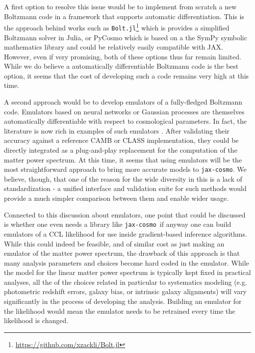 \documentclass[twocolumn,twocolappendix,nofootinbib,iop]{openjournal}
\newcommand{\jaxcosmo}{\texttt{jax-cosmo}}
\begin{document}
A first option to resolve this issue would be to implement from scratch a new Boltzmann code in a framework that supports automatic differentiation. This is the approach behind works such as \texttt{Bolt.jl}\footnote{\url{https://github.com/xzackli/Bolt.jl}} which is provides a simplified Boltzmann solver in Julia, or PyCosmo \citep{pycosmo} which is based on a the SymPy symbolic mathematics library and could be relatively easily compatible with JAX. However, even if very promising, both of these options thus far remain limited. While we do believe a automatically differentiable Boltzmann code is the best option, it seems that the cost of developing such a code remains very high at this time.

A second approach would be to develop emulators of a fully-fledged Boltzmann code. Emulators based on neural networks or Gaussian processes are themselves automatically differentiable with respect to cosmological parameters. In fact, the literature is now rich in examples of such emulators \citep[e.g.][and references therein]{Gunther_2022, nygaard,cosmopower,cosmicnet, emucmb}. After validating their accuracy against a reference CAMB or CLASS implementation, they could be directly integrated as a plug-and-play replacement for the computation of the matter power spectrum. At this time, it seems that using emulators will be the most straightforward approach to bring more accurate models to \jaxcosmo. We believe, though,  that one of the reason for the wide diversity in this is a lack of standardization - a unified interface and validation suite for such methods would provide a much simpler comparison between them and enable wider usage.

\bigskip


Connected to this discussion about emulators, one point that could be discussed is whether one even needs a library like \jaxcosmo\ if anyway one can build emulators of a CCL likelihood for use inside gradient-based inference algorithms. While this could indeed be feasible, and of similar cost as just making an emulator of the matter power spectrum, the drawback of this approach is that many analysis parameters and choices become hard coded in the emulator. While the model for the linear matter power spectrum is typically kept fixed in practical analyses, all the of the choices related in particular to systematics modeling (e.g. photometric redshift errors, galaxy bias, or intrinsic galaxy alignments) will vary significantly in the process of developing the analysis. Building an emulator for the likelihood would mean the emulator needs to be retrained every time the likelihood is changed.
\end{document}
